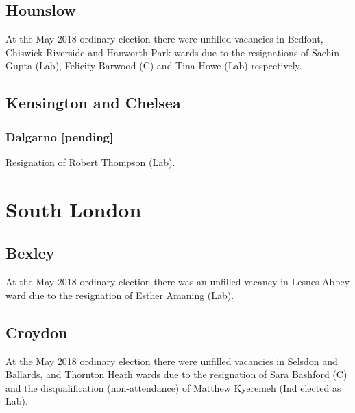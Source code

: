 \documentclass[a4paper,openany]{book}
\begin{document}
\begin{resultsiii}
\subsection*{Hounslow}

At the May 2018 ordinary election there were unfilled vacancies in Bedfont, Chiswick Riverside and Hanworth Park wards due to the resignations of Sachin Gupta (Lab), Felicity Barwood (C) and Tina Howe (Lab) respectively.

\subsection*{Kensington and Chelsea}

\subsubsection*{Dalgarno
\hspace*{\fill}\nolinebreak[1]%
\enspace\hspace*{\fill}
[pending]}


Resignation of Robert Thompson (Lab).

\section{South London}

\subsection*{Bexley}

At the May 2018 ordinary election there was an unfilled vacancy in Lesnes Abbey ward due to the resignation of Esther Amaning (Lab).

\subsection*{Croydon}

At the May 2018 ordinary election there were unfilled vacancies in Selsdon and Ballards, and Thornton Heath wards due to the resignation of Sara Bashford (C) and the disqualification (non-attendance) of Matthew Kyeremeh (Ind elected as Lab).


\end{resultsiii}
\end{document}
